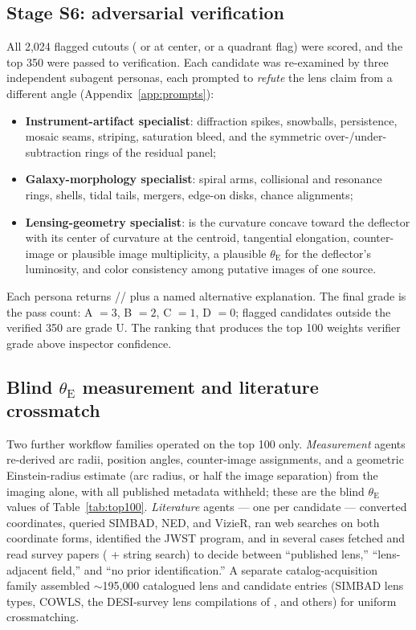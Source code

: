 \documentclass[11pt,letterpaper]{article}
\newcommand{\thetaE}{\ensuremath{\theta_{\mathrm{E}}}}
\newcommand{\numflagged}{2{,}024}
\begin{document}
\subsection{Stage S6: adversarial verification}\label{sec:verification}

All \numflagged{} flagged cutouts ( or  at center, or
a quadrant flag) were scored, and the top 350 were passed to verification.
Each candidate was re-examined by three independent subagent personas, each
prompted to \emph{refute} the lens claim from a different angle
(Appendix~\ref{app:prompts}):

\begin{itemize}
  \item \textbf{Instrument-artifact specialist}: diffraction spikes,
    snowballs, persistence, mosaic seams, striping, saturation bleed, and
    the symmetric over-/under-subtraction rings of the residual panel;
  \item \textbf{Galaxy-morphology specialist}: spiral arms, collisional and
    resonance rings, shells, tidal tails, mergers, edge-on disks, chance
    alignments;
  \item \textbf{Lensing-geometry specialist}: is the curvature concave toward
    the deflector with its center of curvature at the centroid, tangential
    elongation, counter-image or plausible image multiplicity, a plausible
    \thetaE{} for the deflector's luminosity, and color consistency among
    putative images of one source.
\end{itemize}

Each persona returns // plus a named
alternative explanation. The final grade is the pass count: A $=3$, B $=2$,
C $=1$, D $=0$; flagged candidates outside the verified 350 are grade U. The
ranking that produces the top 100 weights verifier grade above inspector
confidence.

\subsection{Blind \thetaE{} measurement and literature crossmatch}
\label{sec:blindtheta}

Two further workflow families operated on the top 100 only. \emph{Measurement}
agents re-derived arc radii, position angles, counter-image assignments, and a
geometric Einstein-radius estimate (arc radius, or half the image separation)
from the imaging alone, with all published metadata withheld; these are the
blind \thetaE{} values of Table~\ref{tab:top100}. \emph{Literature} agents ---
one per candidate --- converted coordinates, queried SIMBAD, NED, and VizieR,
ran web searches on both coordinate forms, identified the JWST program, and in
several cases fetched and read survey papers ( + string
search) to decide between ``published lens,'' ``lens-adjacent field,'' and
``no prior identification.'' A separate catalog-acquisition family assembled
$\sim$195{,}000 catalogued lens and candidate entries (SIMBAD lens types,
COWLS, the DESI-survey lens compilations of
\citealt{huang2020finding,huang2021discovering,storfer2024new,inchausti2025strong},
and others) for uniform crossmatching.
\end{document}

